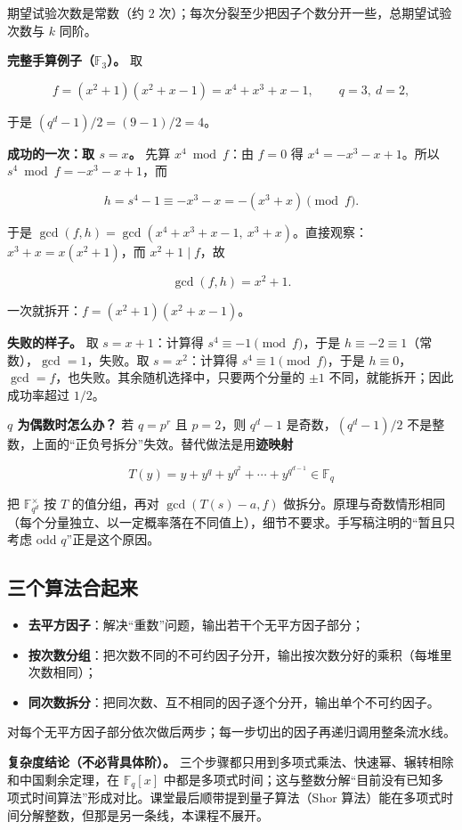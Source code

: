 期望试验次数是常数（约 $2$ 次）；每次分裂至少把因子个数分开一些，总期望试验次数与 $k$ 同阶。

\textbf{完整手算例子（$\mathbb F_3$）。} 取

\[
f=(x^2+1)(x^2+x-1)=x^4+x^3+x-1,\qquad q=3,\ d=2,
\]

于是 $(q^d-1)/2=(9-1)/2=4$。

\textbf{成功的一次：取 $s=x$。} 先算 $x^4\bmod f$：由 $f=0$ 得 $x^4=-x^3-x+1$。所以 $s^4\bmod f=-x^3-x+1$，而

\[
h=s^4-1\equiv -x^3-x=-(x^3+x)\pmod f .
\]

于是 $\gcd(f,h)=\gcd(x^4+x^3+x-1,\ x^3+x)$。直接观察：$x^3+x=x(x^2+1)$，而 $x^2+1\mid f$，故

\[
\gcd(f,h)=x^2+1 .
\]

一次就拆开：$f=(x^2+1)(x^2+x-1)$。

\textbf{失败的样子。} 取 $s=x+1$：计算得 $s^4\equiv-1\pmod f$，于是 $h\equiv-2\equiv1$（常数），$\gcd=1$，失败。取 $s=x^2$：计算得 $s^4\equiv1\pmod f$，于是 $h\equiv0$，$\gcd=f$，也失败。其余随机选择中，只要两个分量的 $\pm1$ 不同，就能拆开；因此成功率超过 $1/2$。

\textbf{$q$ 为偶数时怎么办？} 若 $q=p^r$ 且 $p=2$，则 $q^d-1$ 是奇数，$(q^d-1)/2$ 不是整数，上面的“正负号拆分”失效。替代做法是用\textbf{迹映射}

\[
T(y)=y+y^q+y^{q^2}+\cdots+y^{q^{d-1}}\in\mathbb F_q
\]

把 $\mathbb F_{q^d}^\times$ 按 $T$ 的值分组，再对 $\gcd(T(s)-a,f)$ 做拆分。原理与奇数情形相同（每个分量独立、以一定概率落在不同值上），细节不要求。手写稿注明的“暂且只考虑 odd $q$”正是这个原因。

\subsection{三个算法合起来}


\begin{itemize}
\item \textbf{去平方因子}：解决“重数”问题，输出若干个无平方因子部分；
\item \textbf{按次数分组}：把次数不同的不可约因子分开，输出按次数分好的乘积（每堆里次数相同）；
\item \textbf{同次数拆分}：把同次数、互不相同的因子逐个分开，输出单个不可约因子。
\end{itemize}


对每个无平方因子部分依次做后两步；每一步切出的因子再递归调用整条流水线。

\textbf{复杂度结论（不必背具体阶）。} 三个步骤都只用到多项式乘法、快速幂、辗转相除和中国剩余定理，在 $\mathbb F_q[x]$ 中都是多项式时间；这与整数分解“目前没有已知多项式时间算法”形成对比。课堂最后顺带提到量子算法（Shor 算法）能在多项式时间分解整数，但那是另一条线，本课程不展开。

